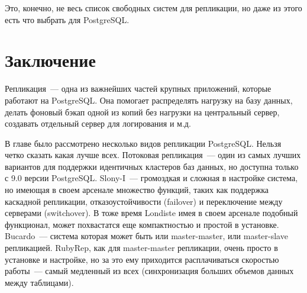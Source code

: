 Это, конечно, не весь список свободных систем для репликации, но даже из этого есть что выбрать для PostgreSQL.










\section{Заключение}

Репликация~--- одна из важнейших частей крупных приложений, которые работают на PostgreSQL. Она помогает распределять нагрузку на базу данных, делать фоновый бэкап одной из копий без нагрузки на центральный сервер, создавать отдельный сервер для логирования и м.д.

В главе было рассмотрено несколько видов репликации PostgreSQL. Нельзя четко сказать какая лучше всех. Потоковая репликация~--- один из самых лучших вариантов для поддержки идентичных кластеров баз данных, но доступна только с 9.0 версии PostgreSQL. Slony-I~--- громоздкая и сложная в настройке система, но имеющая в своем арсенале множество функций, таких как поддержка каскадной репликации, отказоустойчивости (failover) и переключение между серверами (switchover). В тоже время Londiste имея в своем арсенале подобный функционал, может похвастатся еще компактностью и простой в установке. Bucardo~--- система которая может быть или master-master, или master-slave репликацией. RubyRep, как для master-master репликации, очень просто в установке и настройке, но за это ему приходится расплачиваться скоростью работы~--- самый медленный из всех (синхронизация больших объемов данных между таблицами).